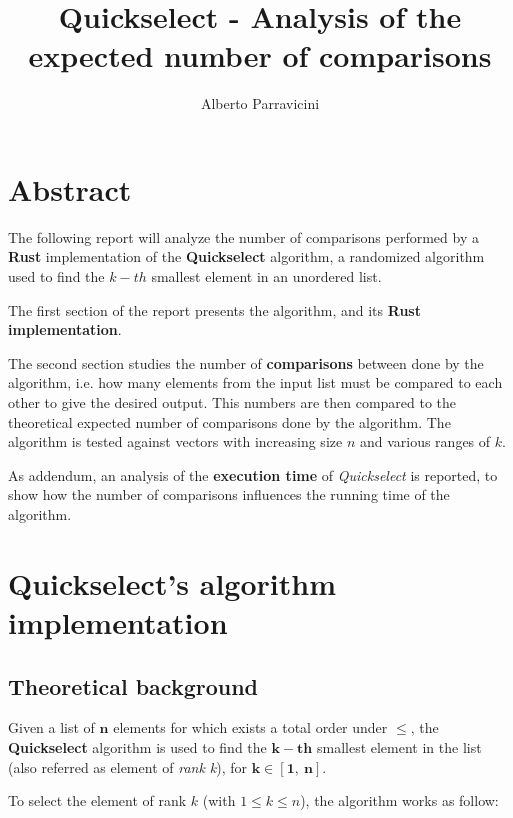 \documentclass[
12pt,
a4paper,
oneside,
headinclude,
footinclude]{article}
\title{\textbf{Quickselect - Analysis of the expected number of comparisons}}
\author{{Alberto Parravicini}}
\date{}	%
\begin{document}
\maketitle
{}
\setcounter{page}{1}

\section{Abstract}
The following report will analyze the number of comparisons performed by a \textbf{Rust} implementation of the \textbf{Quickselect} algorithm, a randomized algorithm used to find the $k-th$ smallest element in an unordered list.

The first section of the report presents the algorithm, and its \textbf{Rust implementation}.

The second section studies the number of \textbf{comparisons} between done by the algorithm,
i.e. how many elements from the input list must be compared to each other to give the desired output.
This numbers are then compared to the theoretical expected number of comparisons done by the algorithm.\newline
The algorithm is tested against vectors with increasing size $n$ and various ranges of $k$. 

As addendum, an analysis of the \textbf{execution time} of \textit{Quickselect} is reported, to show how the number of comparisons influences the running time of the algorithm.

\section{Quickselect's algorithm implementation}
\vspace{-5mm}
\subsection{Theoretical background}
\vspace{-5mm}
Given a list of $\mathbf{n}$ elements for which exists a total order under $\mathbf{\leq}$, the \textbf{Quickselect} algorithm is used to find the $\mathbf{k-th}$ smallest element in the list (also referred as element of \textit{rank k}), for $\mathbf{k \in [1,\ n]}$.

\newpage
To select the element of rank $k$ (with $1 \leq k \leq n$), the algorithm works as follow:
\end{document}
